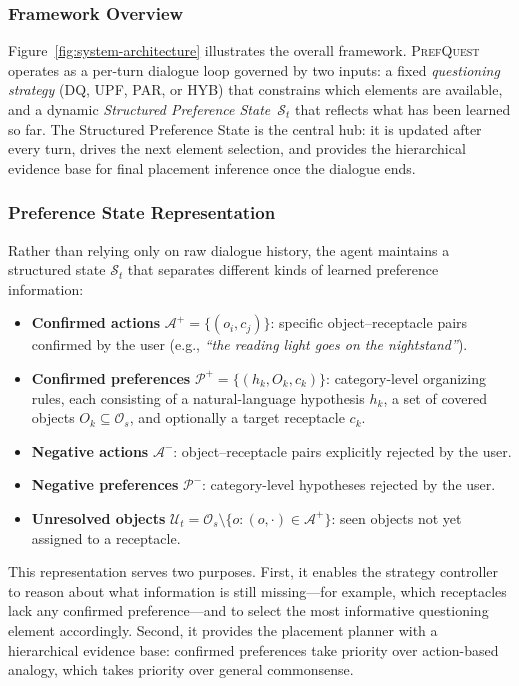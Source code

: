\documentclass[manuscript,review,anonymous]{acmart}
\begin{document}
{\subsubsection{Framework Overview}

Figure~\ref{fig:system-architecture} illustrates the overall framework. \textsc{PrefQuest} operates as a per-turn dialogue loop governed by two inputs: a fixed \textit{questioning strategy} (DQ, UPF, PAR, or HYB) that constrains which elements are available, and a dynamic \textit{Structured Preference State}~$\mathcal{S}_t$ that reflects what has been learned so far. The Structured Preference State is the central hub: it is updated after every turn, drives the next element selection, and provides the hierarchical evidence base for final placement inference once the dialogue ends.

\subsubsection{Preference State Representation}
\label{sec:structured-state}

Rather than relying only on raw dialogue history, the agent maintains a structured state $\mathcal{S}_t$ that separates different kinds of learned preference information:

\begin{itemize}[leftmargin=*]
    \item \textbf{Confirmed actions} $\mathcal{A}^+ = \{(o_i, c_j)\}$: specific object--receptacle pairs confirmed by the user (e.g., \textit{``the reading light goes on the nightstand''}).
    \item \textbf{Confirmed preferences} $\mathcal{P}^+ = \{(h_k, O_k, c_k)\}$: category-level organizing rules, each consisting of a natural-language hypothesis $h_k$, a set of covered objects $O_k \subseteq \mathcal{O}_s$, and optionally a target receptacle $c_k$.
    \item \textbf{Negative actions} $\mathcal{A}^-$: object--receptacle pairs explicitly rejected by the user.
    \item \textbf{Negative preferences} $\mathcal{P}^-$: category-level hypotheses rejected by the user.
    \item \textbf{Unresolved objects} $\mathcal{U}_t = \mathcal{O}_s \setminus \{o : (o, \cdot) \in \mathcal{A}^+\}$: seen objects not yet assigned to a receptacle.
\end{itemize}

This representation serves two purposes. First, it enables the strategy controller to reason about what information is still missing---for example, which receptacles lack any confirmed preference---and to select the most informative questioning element accordingly. Second, it provides the placement planner with a hierarchical evidence base: confirmed preferences take priority over action-based analogy, which takes priority over general commonsense.

}
\end{document}
